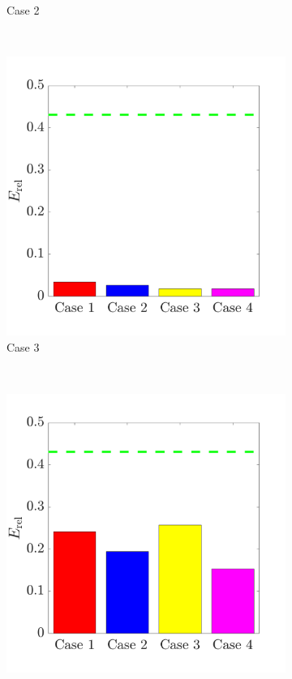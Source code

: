 \documentclass{jov}
\begin{document}
\begin{figure}
\begin{subfigure}{0.22 \textwidth}
	\caption{Case 2}
	\label{fig:case2Bar}
    \end{subfigure}
    ~ 
        \begin{subfigure}{0.22 \textwidth}
	\includegraphics[width=\textwidth]{../Figures/Figure15/Figure15_c.pdf}
	\caption{Case 3}
	\label{fig:case3Bar}
    \end{subfigure}
    ~ 
        \begin{subfigure}{0.22 \textwidth}
	\includegraphics[width=\textwidth]{../Figures/Figure15/Figure15_d.pdf}

\end{subfigure}
\end{figure}
\end{document}

